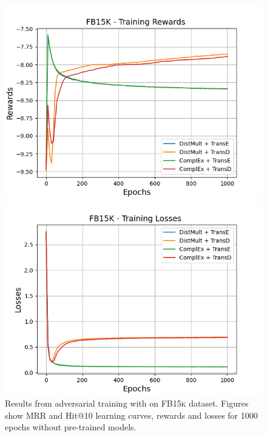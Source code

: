 \begin{figure}[H]
    \begin{minipage}{.5\textwidth}
      \centering
      \includegraphics[width=\linewidth]{figures/results/gan_train/not_pretrained/uncertainty/max_distribution/entropy/fb15k/1k_epochs/uncertainty_fb15k_rew.png}
    \end{minipage}%
     \begin{minipage}{.5\textwidth}
      \centering
      \includegraphics[width=\linewidth]{figures/results/gan_train/not_pretrained/uncertainty/max_distribution/entropy/fb15k/1k_epochs/uncertainty_fb15k_losses.png}
    \end{minipage}%
    \caption{Results from adversarial training with \ussoftmax on \textsc{FB15k} dataset.
    Figures show MRR and Hit@10 learning curves, rewards and losses for 1000 epochs without pre-trained models.}
    \label{fig:gan_train_not_pretrained_ussoftmax_fb15k}
\end{figure}
